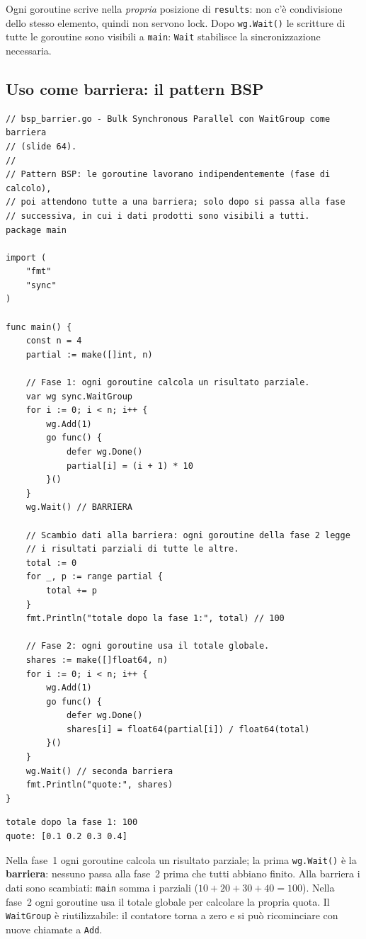 \documentclass[11pt,a4paper]{report}
\newcommand{\cod}[1]{\texttt{#1}}
\begin{document}
Ogni goroutine scrive nella \emph{propria} posizione di \cod{results}: non c'è
condivisione dello stesso elemento, quindi non servono lock. Dopo
\cod{wg.Wait()} le scritture di tutte le goroutine sono visibili a \cod{main}:
\cod{Wait} stabilisce la sincronizzazione necessaria.

\subsection{Uso come barriera: il pattern BSP}

\begin{lstlisting}[style=gocode,caption={\texttt{06\_concurrency/bsp\_barrier.go}}]
// bsp_barrier.go - Bulk Synchronous Parallel con WaitGroup come barriera
// (slide 64).
//
// Pattern BSP: le goroutine lavorano indipendentemente (fase di calcolo),
// poi attendono tutte a una barriera; solo dopo si passa alla fase
// successiva, in cui i dati prodotti sono visibili a tutti.
package main

import (
	"fmt"
	"sync"
)

func main() {
	const n = 4
	partial := make([]int, n)

	// Fase 1: ogni goroutine calcola un risultato parziale.
	var wg sync.WaitGroup
	for i := 0; i < n; i++ {
		wg.Add(1)
		go func() {
			defer wg.Done()
			partial[i] = (i + 1) * 10
		}()
	}
	wg.Wait() // BARRIERA

	// Scambio dati alla barriera: ogni goroutine della fase 2 legge
	// i risultati parziali di tutte le altre.
	total := 0
	for _, p := range partial {
		total += p
	}
	fmt.Println("totale dopo la fase 1:", total) // 100

	// Fase 2: ogni goroutine usa il totale globale.
	shares := make([]float64, n)
	for i := 0; i < n; i++ {
		wg.Add(1)
		go func() {
			defer wg.Done()
			shares[i] = float64(partial[i]) / float64(total)
		}()
	}
	wg.Wait() // seconda barriera
	fmt.Println("quote:", shares)
}
\end{lstlisting}
\begin{lstlisting}[style=output]
totale dopo la fase 1: 100
quote: [0.1 0.2 0.3 0.4]
\end{lstlisting}

Nella fase~1 ogni goroutine calcola un risultato parziale; la prima
\cod{wg.Wait()} è la \textbf{barriera}: nessuno passa alla fase~2 prima che tutti
abbiano finito. Alla barriera i dati sono scambiati: \cod{main} somma i parziali
($10+20+30+40=100$). Nella fase~2 ogni goroutine usa il totale globale per
calcolare la propria quota. Il \cod{WaitGroup} è riutilizzabile: il contatore
torna a zero e si può ricominciare con nuove chiamate a \cod{Add}.
\end{document}
